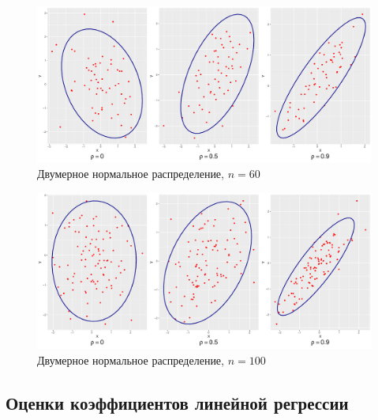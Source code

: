 \documentclass[a4paper]{article}
\begin{document}
\begin{figure}[H]
    \centering
    \includegraphics[width = \textwidth, height = 7 cm]{LabSrcs/resources/ellipse60.pdf}
    \caption{Двумерное нормальное распределение, $n=60$}
    \label{fig:el60}
\end{figure}
\begin{figure}[H]
    \centering
    \includegraphics[width = \textwidth, height = 7 cm]{LabSrcs/resources/ellipse100.pdf}
    \caption{Двумерное нормальное распределение, $n=100$}
    \label{fig:el100}
\end{figure}
\subsection{Оценки коэффициентов линейной регрессии}
\end{document}
